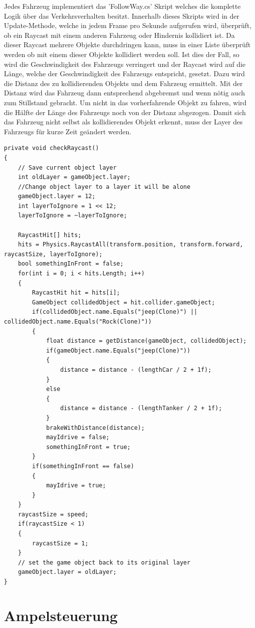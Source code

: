 Jedes Fahrzeug implementiert das 'FollowWay.cs' Skript welches die komplette Logik über das Verkehrsverhalten besitzt. Innerhalb dieses Skripts wird in der Update-Methode, welche in jedem Frame pro Sekunde aufgerufen wird, überprüft, ob ein Raycast mit einem anderen Fahrzeug oder Hindernis kollidiert ist. Da dieser Raycast mehrere Objekte durchdringen kann, muss in einer Liste überprüft werden ob mit einem dieser Objekte kollidiert werden soll. Ist dies der Fall, so wird die Geschwindigkeit des Fahrzeugs verringert und der Raycast wird auf die Länge, welche der Geschwindigkeit des Fahrzeugs entspricht, gesetzt. Dazu wird die Distanz des zu kollidierenden Objekts und dem Fahrzeug ermittelt. Mit der Distanz wird das Fahrzeug dann entsprechend abgebremst und wenn nötig auch zum Stillstand gebracht. Um nicht in das vorherfahrende Objekt zu fahren, wird die Hälfte der Länge des Fahrzeugs noch von der Distanz abgezogen. Damit sich das Fahrzeug nicht selbst als kollidierendes Objekt erkennt, muss der Layer des Fahrzeugs für kurze Zeit geändert werden.

\begin{lstlisting}[caption={Erkennen von anderen Fahrzeugen und Hindernissen},label={lst:Hinderniss_erkennen}]
private void checkRaycast()
{
	// Save current object layer
	int oldLayer = gameObject.layer;
	//Change object layer to a layer it will be alone
	gameObject.layer = 12;
	int layerToIgnore = 1 << 12;
	layerToIgnore = ~layerToIgnore;

	RaycastHit[] hits;		
	hits = Physics.RaycastAll(transform.position, transform.forward, raycastSize, layerToIgnore);
	bool somethingInFront = false;
	for(int i = 0; i < hits.Length; i++)
	{
		RaycastHit hit = hits[i];
		GameObject collidedObject = hit.collider.gameObject;
		if(collidedObject.name.Equals("jeep(Clone)") || collidedObject.name.Equals("Rock(Clone)"))
		{
			float distance = getDistance(gameObject, collidedObject);
			if(gameObject.name.Equals("jeep(Clone)"))
			{
				distance = distance - (lengthCar / 2 + 1f);
			}
			else
			{
				distance = distance - (lengthTanker / 2 + 1f);
			}
			brakeWithDistance(distance);
			mayIdrive = false;
			somethingInFront = true;
		}
		if(somethingInFront == false)
		{
			mayIdrive = true;
		}
	}
	raycastSize = speed;
	if(raycastSize < 1)
	{
		raycastSize = 1;
	}
	// set the game object back to its original layer
	gameObject.layer = oldLayer;
}
\end{lstlisting}

\section{Ampelsteuerung}
\label{Ampelsteuerung}

